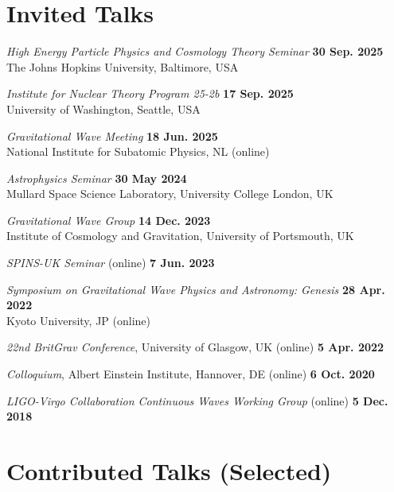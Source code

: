 \newcommand{\playsymbol}{$\blacktriangleright$}

\section{Invited Talks}

\secstartswithlist{}%
\begin{etaremune}
    \item \textit{High Energy Particle Physics and Cosmology Theory Seminar}
    \hfill \textbf{30 Sep. 2025} \\
    The Johns Hopkins University, Baltimore, USA
    \item \textit{Institute for Nuclear Theory Program 25-2b}
    \hfill \textbf{17 Sep. 2025} \\
    University of Washington, Seattle, USA
    \item \textit{Gravitational Wave Meeting} \hfill \textbf{18 Jun. 2025} \\
    National Institute for Subatomic Physics, NL (online)
    \item \textit{Astrophysics Seminar} \hfill \textbf{30 May 2024} \\
    Mullard Space Science Laboratory, University College London, UK
    \item \textit{Gravitational Wave Group} \hfill \textbf{14 Dec. 2023} \\
    Institute of Cosmology and Gravitation, University of Portsmouth, UK
    \item \textit{SPINS-UK Seminar} (online) \hfill \textbf{7 Jun. 2023}
    \item
    \textit{Symposium on Gravitational Wave Physics and Astronomy: Genesis}
    \hfill \textbf{28 Apr. 2022} \\
    Kyoto University, JP (online)
    \item \textit{22nd BritGrav Conference}, University of Glasgow, UK (online)
    \hfill \textbf{5 Apr. 2022}
    \item \textit{Colloquium}, Albert Einstein Institute, Hannover, DE (online)
    \hfill \textbf{6 Oct. 2020}
    \item \textit{LIGO-Virgo Collaboration Continuous Waves Working Group}
    (online) \hfill \textbf{5 Dec. 2018}
\end{etaremune}

\section{Contributed Talks (Selected)}

